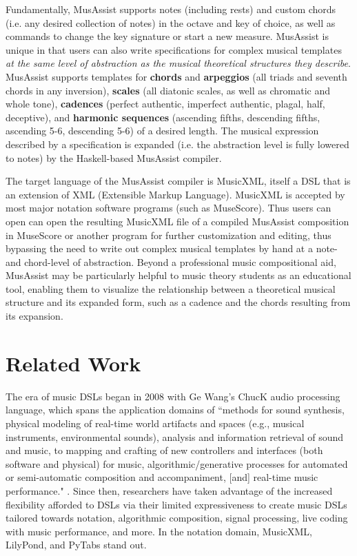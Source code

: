 \documentclass{article}
\begin{document}
Fundamentally, MusAssist supports notes (including rests) and custom chords (i.e. any desired collection of notes)
in the octave and key of choice, as well as commands to change the key signature or start a new measure.
 MusAssist is unique in that users can also write specifications for complex musical templates \textit{at the same level of abstraction
as the musical theoretical structures they describe}. MusAssist supports templates for
\textbf{chords} and \textbf{arpeggios} (all triads and seventh chords in any inversion),
\textbf{scales} (all diatonic scales, as well as chromatic and whole tone),
\textbf{cadences} (perfect authentic, imperfect authentic, plagal, half, deceptive), and 
\textbf{harmonic sequences} (ascending
fifths, descending fifths, ascending 5-6, descending 5-6) of a desired length. The musical expression 
described by a specification is expanded (i.e. the abstraction level is
fully lowered to notes) by the Haskell-based MusAssist compiler.

The target language of the MusAssist compiler is MusicXML, itself a DSL that is an extension of
XML (Extensible Markup Language). MusicXML is accepted by most major notation software programs (such as MuseScore). 
Thus users can open can open the resulting MusicXML file of a compiled MusAssist composition in MuseScore or another
program for further customization and editing, thus bypassing the need to write out complex musical templates by hand at a 
note- and chord-level of abstraction. Beyond a professional music compositional aid, MusAssist may be particularly 
helpful to music theory students as an educational tool, enabling them to visualize the relationship between a theoretical musical structure 
and its expanded form, such as a cadence and the chords resulting from its expansion.


\section{Related Work}\label{sec:related_work}

The era of music DSLs began in 2008 with Ge Wang's ChucK audio processing language, which  
spans the application domains of ``methods for sound synthesis, physical modeling of real-time world artifacts and spaces (e.g., 
musical instruments, environmental sounds), analysis and information retrieval of sound and music, to 
mapping and crafting of new controllers and interfaces (both software and physical) for music, 
algorithmic/generative processes for automated or semi-automatic composition and accompaniment, [and] 
real-time music performance." \cite{wang_2008}. 
Since then, researchers have taken advantage of the increased flexibility afforded to DSLs via their limited expressiveness to create
music DSLs tailored towards notation, algorithmic composition, signal processing, live coding with music performance, and more. In the 
 notation domain, MusicXML, LilyPond, and PyTabs stand out.
\end{document}
